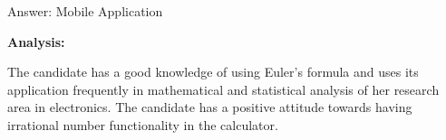 \documentclass[12pt]{report}
\begin{document}
Answer: Mobile Application\par


\vspace{\baselineskip}
{\fontsize{14pt}{16.8pt}\selectfont \textbf{\textcolor[HTML]{2F5496}{Analysis: }}\par}The candidate has a good knowledge of using Euler’s formula and uses its application frequently in mathematical and statistical analysis of her research area in electronics. The candidate has a positive attitude towards having irrational number functionality in the calculator. \par


\vspace{\baselineskip}

\vspace{\baselineskip}

\vspace{\baselineskip}

\vspace{\baselineskip}

\vspace{\baselineskip}

\vspace{\baselineskip}

\vspace{\baselineskip}

\vspace{\baselineskip}

\vspace{\baselineskip}

\vspace{\baselineskip}

\vspace{\baselineskip}

\vspace{\baselineskip}

\vspace{\baselineskip}

\vspace{\baselineskip}

\vspace{\baselineskip}

\vspace{\baselineskip}

\vspace{\baselineskip}

\vspace{\baselineskip}

\vspace{\baselineskip}
\end{document}
